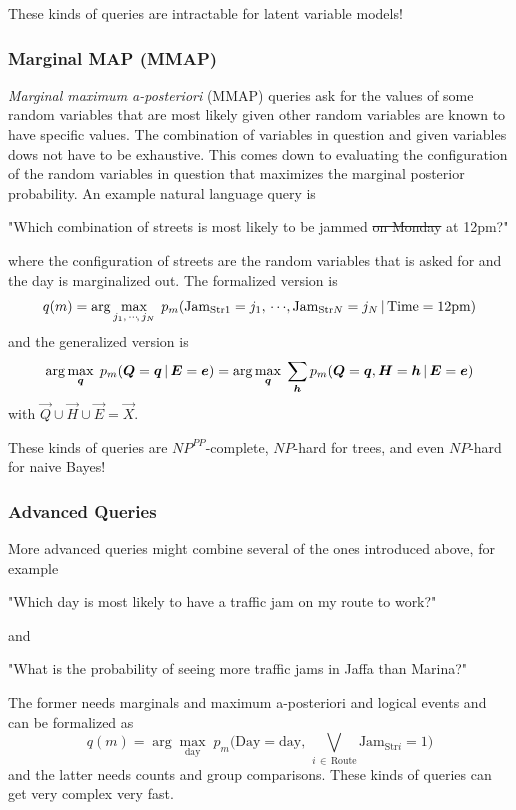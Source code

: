 				These kinds of queries are intractable for latent variable models!

			\subsubsection{Marginal MAP (MMAP)}
				\emph{Marginal maximum a-posteriori} (MMAP) queries ask for the values of some random variables that are most likely given other random variables are known to have specific values. The combination of variables in question and given variables dows not have to be exhaustive. This comes down to evaluating the configuration of the random variables in question that maximizes the marginal posterior probability. An example natural language query is
				\begin{center}
					"Which combination of streets is most likely to be jammed \sout{on Monday} at 12pm?"
				\end{center}
				where the configuration of streets are the random variables that is asked for and the day is marginalized out. The formalized version is
				\begin{equation}
					q(m) = \arg\max_{j_1,\,\cdots\!,\,j_N} \; p_m(\text{Jam}_{\text{Str}1} = j_1,\,\cdots\!,\text{Jam}_{\text{Str}N} = j_N \,\vert\, \text{Time} = \text{12pm})
				\end{equation}
				and the generalized version is
				\begin{equation}
					\arg\max_{\bm{q}} \; p_m(\bm{Q} = \bm{q} \,\vert\, \bm{E} = \bm{e})
						= \arg\max_{\bm{q}} \; \sum_{\bm{h}} p_m(\bm{Q} = \bm{q}, \bm{H} = \bm{h} \,\vert\, \bm{E} = \bm{e})
				\end{equation}
				with \( \vec{Q} \cup \vec{H} \cup \vec{E} = \vec{X} \).

				These kinds of queries are \( \mathit{NP}^\mathit{PP} \)-complete, \( \mathit{NP} \)-hard for trees, and even \(\mathit{NP}\)-hard for naive Bayes!

			\subsubsection{Advanced Queries}
				More advanced queries might combine several of the ones introduced above, for example
				\begin{center}
					"Which day is most likely to have a traffic jam on my route to work?"
				\end{center}
				and
				\begin{center}
					"What is the probability of seeing more traffic jams in Jaffa than Marina?"
				\end{center}
				The former needs marginals and maximum a-posteriori and logical events and can be formalized as
				\begin{equation}
					q(m) = \arg\max_{\text{day}} \; p_m\Big(\text{Day} = \text{day},\, \textstyle\bigvee_{i \,\in\, \text{Route}}\displaystyle \text{Jam}_{\text{Str}i} = 1\Big)
				\end{equation}
				and the latter needs counts and group comparisons. These kinds of queries can get very complex very fast.

